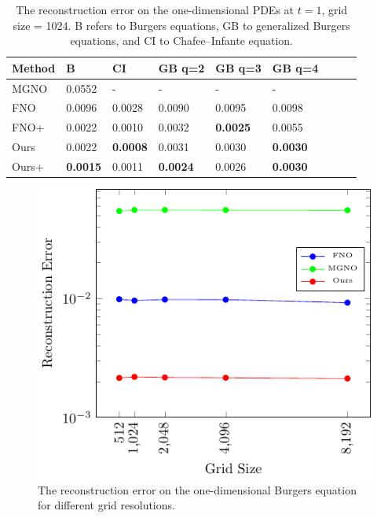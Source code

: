\documentclass{article}
\theoremstyle{plain}
\theoremstyle{definition}
\theoremstyle{remark}
\begin{document}
\begin{table}[t]
\caption{The reconstruction error on the one-dimensional PDEs at $t= 1$, grid size = 1024.  B refers to Burgers equations,  GB to generalized Burgers equations,  and CI to Chafee–Infante equation.}
\label{tab:1dresults}
\begin{center}
\begin{tabular}{lllllllll}
\toprule
    Method &         B &          CI &     GB q=2 &     GB q=3 &     GB q=4\\
\midrule
MGNO & 0.0552 & -&-&-&-\\
       FNO &          0.0096 &          0.0028 &          0.0090 &          0.0095 &          0.0098\\
       FNO+ &          0.0022 &          0.0010 &          0.0032 & \textbf{0.0025} &          0.0055  \\
Ours &          0.0022 &          \textbf{0.0008} &0.0031 &          0.0030 &  \textbf{0.0030}\\
Ours+ & \textbf{0.0015} &          0.0011 & \textbf{0.0024} &          0.0026 &          \textbf{0.0030 }\\
\bottomrule
\end{tabular}
\end{center}
\end{table}
\begin{figure}[t]
    \centering
    \includegraphics[width=0.45\linewidth]{figures/burgers_results_1d_1000.pdf}
    \caption{The reconstruction error on the one-dimensional Burgers equation for different grid resolutions.}
  \label{fig:nshot10}
\end{figure}
\end{document}
